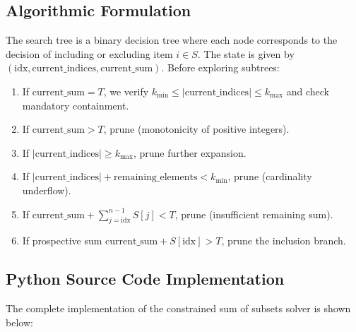 \documentclass[12pt]{article}
\begin{document}
\subsection{Algorithmic Formulation}
The search tree is a binary decision tree where each node corresponds to the decision of including or excluding item $i \in S$. The state is given by $(\text{idx}, \text{current\_indices}, \text{current\_sum})$.
Before exploring subtrees:
\begin{enumerate}
    \item If $\text{current\_sum} = T$, we verify $k_{\min} \le |\text{current\_indices}| \le k_{\max}$ and check mandatory containment.
    \item If $\text{current\_sum} > T$, prune (monotonicity of positive integers).
    \item If $|\text{current\_indices}| \ge k_{\max}$, prune further expansion.
    \item If $|\text{current\_indices}| + \text{remaining\_elements} < k_{\min}$, prune (cardinality underflow).
    \item If $\text{current\_sum} + \sum_{j=\text{idx}}^{n-1} S[j] < T$, prune (insufficient remaining sum).
    \item If prospective sum $\text{current\_sum} + S[\text{idx}] > T$, prune the inclusion branch.
\end{enumerate}

\subsection{Python Source Code Implementation}
The complete implementation of the constrained sum of subsets solver is shown below:
\end{document}
